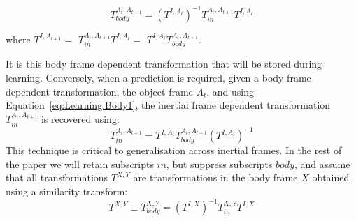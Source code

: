 \begin{equation}
T_{body}^{A_{t}, A_{t+1}} = (T^{I, A_{t}})^{-1} T_{in}^{A_{t}, A_{t+1}} T^{I, A_{t}}
\label{eq:Learning.Body1}
\end{equation}

\noindent where $T^{I, A_{t+1}} =$ $T_{in}^{A_{t}, A_{t+1}} T^{I, A_{t}} =$ $T^{I, A_{t}} T_{body}^{A_{t}, A_{t+1}}$.

It is this body frame dependent transformation that will be stored during learning. Conversely, when a prediction is required, given a body frame dependent transformation, the object
frame $A_{t}$, and using Equation~\eqref{eq:Learning.Body1}, the
inertial frame dependent transformation $T_{in}^{A_{t}, A_{t+1}}$ is
recovered using:
\begin{equation}
T_{in}^{A_{t}, A_{t+1}} = T^{I, A_{t}} T_{body}^{A_{t}, A_{t+1}} (T^{I, A_{t}})^{-1}
\label{eq:Learning.Body2}
\end{equation}
This technique is critical to generalisation across inertial frames. In the rest of the paper we will retain subscripts $in$, but suppress subscripts $body$, and assume that all transformations $T^{X, Y}$ are transformations in the body frame $X$ obtained using a similarity transform:
\begin{equation}
T^{X, Y} \equiv T_{body}^{X, Y} = ({T^{I, X}})^{-1} T_{in}^{X, Y} {T^{I, X}}
\label{eq:Learning.Similarity}
\end{equation}
%
